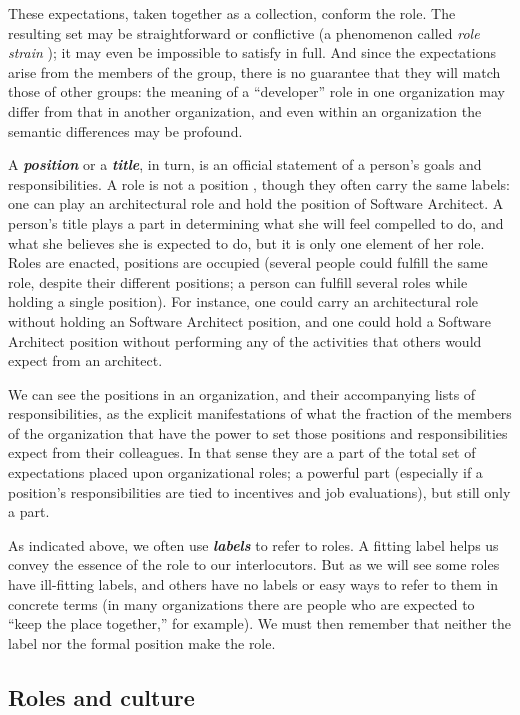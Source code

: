 \documentclass[10pt, conference, compsocconf]{IEEEtran}
\begin{document}
These expectations, taken together as a collection, conform the role. The resulting set may be straightforward or conflictive (a phenomenon called \emph{role strain} \cite{Goode1960}); it may even be impossible to satisfy in full. And since the expectations arise from the members of the group, there is no guarantee that they will match those of other groups: the meaning of a ``developer'' role in one organization may differ from that in another organization, and even within an organization the semantic differences may be profound.

A \textbf{\emph{position}} or a \textbf{\emph{title}}, in turn, is an official statement of a person's goals and responsibilities. A role is not a position \cite{Turner1956}, though they often carry the same labels: one can play an architectural role and hold the position of Software Architect. A person's title plays a part in determining what she will feel compelled to do, and what she believes she is expected to do, but it is only one element of her role. Roles are enacted, positions are occupied (several people could fulfill the same role, despite their different positions; a person can fulfill several roles while holding a single position). For instance, one could carry an architectural role without holding an Software Architect position, and one could hold a Software Architect position without performing any of the activities that others would expect from an architect.

We can see the positions in an organization, and their accompanying lists of responsibilities, as the explicit manifestations of what the fraction of the members of the organization that have the power to set those positions and responsibilities expect from their colleagues. In that sense they are a part of the total set of expectations placed upon organizational roles; a powerful part (especially if a position's responsibilities are tied to incentives and job evaluations), but still only a part.

As indicated above, we often use \textbf{\emph{labels}} to refer to roles. A fitting label helps us convey the essence of the role to our interlocutors. But as we will see some roles have ill-fitting labels, and others have no labels or easy ways to refer to them in concrete terms (in many organizations there are people who are expected to ``keep the place together,'' for example). We must then remember that neither the label nor the formal position make the role. 


\subsection{Roles and culture}
\end{document}
